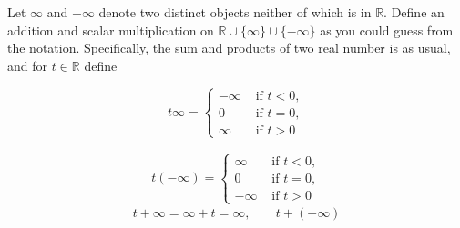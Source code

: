\documentclass[letter,12pt]{article}
\date{\today}
\newcommand{\R}{\mathbb{R}}
\begin{document}
\pagestyle{fancy}
\begin{tcolorbox}
Let $\infty$ and $-\infty$ denote two distinct objects neither of which is in $\R$. Define an addition and scalar multiplication on $\R \cup \{\infty\}\cup \{-\infty\}$ as you could guess from the notation. Specifically, the sum and products of two real number is as usual, and for $t\in \R$ define 

\begin{equation*}
    t\infty = \begin{cases}
        -\infty  & \text{ if  }t<0,\\
        0 & \text{  if } t=0,\\
        \infty & \text{ if } t>0
    \end{cases}
\end{equation*}

\begin{eqnarray*}
    t(-\infty)= \begin{cases}
        \infty  & \text{ if  }t<0,\\
        0 & \text{  if } t=0,\\
        -\infty & \text{ if } t>0
    \end{cases} 
\end{eqnarray*}
\begin{equation*}
    t+\infty =\infty + t= \infty, \;\;\;\;\;\;\; t+(-\infty)
\end{equation*}
\end{tcolorbox}
\end{document}
